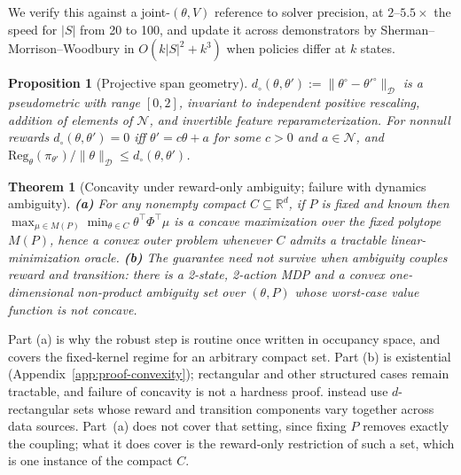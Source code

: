 \documentclass{article}
\newtheorem{theorem}{Theorem}
\newtheorem{proposition}{Proposition}
\newcommand{\Dnorm}[1]{\|#1\|_{\mathcal D}}
\begin{document}
We verify this against a joint-$(\theta,V)$ reference to solver precision, at
$2$--$5.5\times$ the speed for $|S|$ from 20 to 100, and update it across
demonstrators by Sherman--Morrison--Woodbury in $O(k|S|^2+k^3)$ when policies
differ at $k$ states.

\begin{proposition}[Projective span geometry]
\label{prop:projective}
$d_\circ(\theta,\theta'):=\Dnorm{\theta^\circ-\theta'^\circ}$ is a pseudometric
with range $[0,2]$, invariant to independent positive rescaling, addition of
elements of $\mathcal N$, and invertible feature reparameterization. For
nonnull rewards $d_\circ(\theta,\theta')=0$ iff $\theta'=c\theta+a$ for some
$c>0$ and $a\in\mathcal N$, and
$\mathrm{Reg}_{\theta}(\pi_{\theta'})/\Dnorm{\theta}\le d_\circ(\theta,\theta')$.
\end{proposition}

\begin{theorem}[Concavity under reward-only ambiguity; failure with dynamics ambiguity]
\label{thm:convexity}
\textbf{(a)} For \emph{any} nonempty compact $C\subseteq\mathbb R^d$, if $P$ is
fixed and known then $\max_{\mu\in M(P)}\min_{\theta\in C}\theta^\top\Phi^\top\mu$
is a concave maximization over the fixed polytope $M(P)$, hence a convex outer
problem whenever $C$ admits a tractable linear-minimization oracle.
\textbf{(b)} The guarantee need not survive when ambiguity couples reward and
transition: there is a 2-state, 2-action MDP and a convex one-dimensional
non-product ambiguity set over $(\theta,P)$ whose worst-case value function is
not concave.
\end{theorem}

Part (a) is why the robust step is routine once written in occupancy space, and
covers the fixed-kernel regime for an arbitrary compact set. Part (b) is
existential (Appendix~\ref{app:proof-convexity}); rectangular and other
structured cases remain tractable, and failure of concavity is not a hardness
proof. \citet{xu2026learning} instead use $d$-rectangular sets whose reward and
transition components vary together across data sources. Part~(a) does not
cover that setting, since fixing $P$ removes exactly the coupling; what it does
cover is the reward-only restriction of such a set, which is one instance of
the compact $C$.
\end{document}
